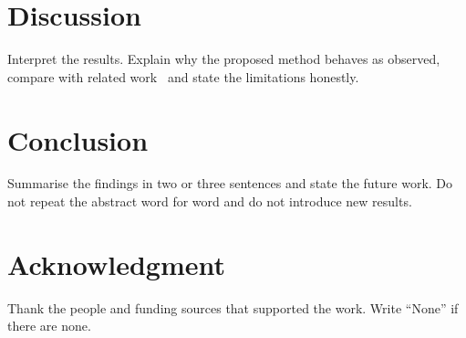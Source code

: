 \documentclass[journal]{IEEEtran}
\begin{document}
\section{Discussion}
Interpret the results. Explain why the proposed method behaves as observed, compare with related work~\cite{vaswani2017attention} and state the limitations honestly.

\section{Conclusion}
Summarise the findings in two or three sentences and state the future work. Do not repeat the abstract word for word and do not introduce new results.

\section*{Acknowledgment}
Thank the people and funding sources that supported the work. Write ``None'' if there are none.



\end{document}

